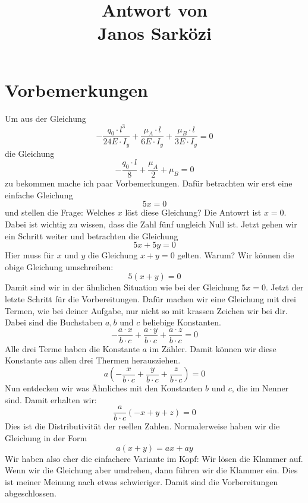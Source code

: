 \documentclass[11pt, a4paper]{article}
\title{%
  Antwort von \\
  \large Janos Sarközi}
\begin{document}
\maketitle
\section{Vorbemerkungen}
Um aus der Gleichung 
\begin{equation}
    -\frac{q_0\cdot l^3}{24E\cdot I_y} + \frac{\mu_A\cdot l}{6E\cdot I_y} +
    \frac{\mu_B\cdot l}{3E\cdot I_y} = 0
\end{equation}
die Gleichung
\begin{equation}
    - \frac{q_0\cdot l}{8} + \frac{\mu_A}{2} + \mu_B = 0
\end{equation}
zu bekommen mache ich paar Vorbemerkungen. Dafür betrachten wir erst eine einfache Gleichung
\[
5x = 0
\]
und stellen die Frage: Welches $x$ löst diese Gleichung? Die Antowrt ist $x =
0$. Dabei ist wichtig zu wissen, dass die Zahl fünf ungleich Null ist. Jetzt
gehen wir ein Schritt weiter und betrachten die Gleichung
\[
5x + 5y = 0
\]
Hier muss für $x$ und $y$ die Gleichung $x+y=0$ gelten. Warum? Wir können die
obige Gleichung umschreiben:
\[
5(x + y) = 0
\]
Damit sind wir in der ähnlichen Situation wie bei der Gleichung $5x=0$. Jetzt
der letzte Schritt für die Vorbereitungen. Dafür machen wir eine Gleichung mit
drei Termen, wie bei deiner Aufgabe, nur nicht so mit krassen Zeichen wir bei
dir. Dabei sind die Buchstaben $a, b$ und $c$ beliebige Konstanten.
\[
    -\frac{a\cdot x}{b\cdot c} + \frac{a\cdot y}{b\cdot c} + \frac{a\cdot
    z}{b\cdot c} = 0
\]
\newpage
Alle drei Terme haben die Konstante $a$ im Zähler. Damit können wir diese
Konstante aus allen drei Thermen herausziehen.
\[
    a\left(-\frac{x}{b\cdot c} + \frac{y}{b\cdot c} + \frac{z}{b\cdot c}\right)
    = 0
\]
Nun entdecken wir was Ähnliches mit den Konstanten $b$ und $c$, die im Nenner
sind. Damit erhalten wir:
\[
    \frac{a}{b\cdot c}(-x + y + z) = 0
\]
Dies ist die Distributivität der reellen Zahlen. Normalerweise haben wir die
Gleichung in der Form
\[
    a(x+y) = ax+ay
\]
Wir haben also eher die einfachere Variante im Kopf: Wir lösen die Klammer auf.
Wenn wir die Gleichung aber umdrehen, dann führen wir die Klammer ein. Dies ist
meiner Meinung nach etwas schwieriger. Damit sind die Vorbereitungen
abgeschlossen.
\end{document}
